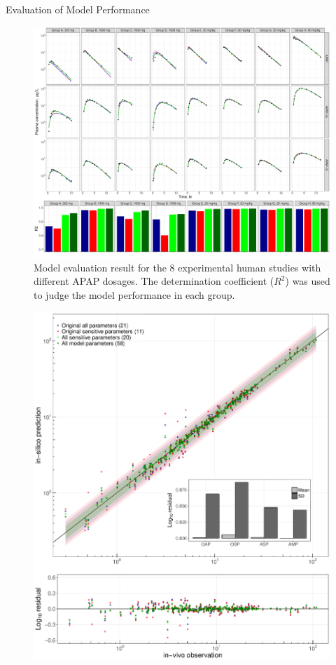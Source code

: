 \documentclass[xcolor=table]{beamer}
\begin{document}
\begin{frame}[t]
\begin{columns}[t]
\begin{column}{0.22\paperwidth} %
%
%
\begin{block}{Evaluation of Model Performance}
\begin{figure}
\includegraphics[width=\linewidth]{fig7.pdf}
\caption{Model evaluation result for the 8 experimental human studies with different APAP dosages. 
  The determination coefficient ($R^2$) was used to judge the model performance in each group.
}
\end{figure}
\begin{figure}
\begin{columns}
\includegraphics[width=\textwidth]{fig8.pdf}

\end{columns}
\end{figure}
\end{block}
\end{column}
\end{columns}
\end{frame}
\end{document}

